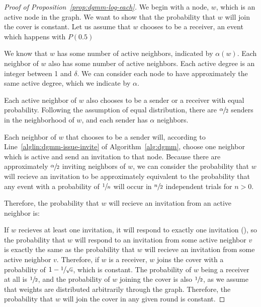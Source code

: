 \begin{proof}[Proof of Proposition~\ref{prop:dgmm-log-each}]

We begin with a node, $w$, which is an active node in the graph. We want to show that the probability that $w$ will join the cover is constant. Let us assume that $w$ chooses to be a receiver, an event which happens with $P(0.5)$

We know that $w$ has some number of active neighbors, indicated by $\alpha(w)$. Each neighbor of $w$ also has some number of active neighbors. Each active degree is an integer between 1 and $\delta$. We can consider each node to have approximately the same active degree, which we indicate by $\alpha$. 

Each active neighbor of $w$ also chooses to be a sender or a receiver with equal probability. Following the assumption of equal distribution, there are $\sfrac{\alpha}{2}$ senders in the neighborhood of $w$, and each sender has $\alpha$ neighbors.

Each neighbor of $w$ that chooses to be a sender will, according to Line~\ref{alglin:dgmm-issue-invite} of Algorithm~\ref{alg:dgmm}, choose one neighbor which is active and send an invitation to that node. Because there are approximately $\sfrac{\alpha}{2}$ inviting neighbors of $w$, we can consider the probability that $w$ will recieve an invitation to be approximately equivalent to the probability that any event with a probability of $\sfrac{1}{n}$ will occur in $\sfrac{n}{2}$ independent trials for $n > 0$. 

Therefore, the probability that $w$ will recieve an invitation from an active neighbor is: 

If $w$ recieves at least one invitation, it will respond to exactly one invitation (), so the probability that $w$ will respond to an invitation from some active neighbor $v$ is exactly the same as the probability that $w$ will recieve an invitation from some active neighbor $v$. Therefore, if $w$ is a receiver, $w$ joins the cover with a probability of $1 - \sfrac{1}{\sqrt{{\mathrm{e}}}}$, which is constant. The probability of $w$ being a receiver at all is $\sfrac{1}{2}$, and the probability of $w$ joining the cover is also $\sfrac{1}{2}$, as we assume that weights are distributed arbitrarily through the graph. Therefore, the probability that $w$ will join the cover in any given round is constant.
\end{proof}
